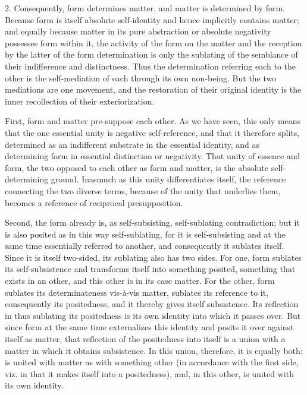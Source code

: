 2. Consequently, form determines matter,
and matter is determined by form.
Because form is itself absolute self-identity
and hence implicitly contains matter;
and equally because matter in its pure abstraction
or absolute negativity possesses form within it,
the activity of the form on the matter
and the reception by the latter of the form determination is only
the sublating of the semblance of their indifference and distinctness.
Thus the determination referring each to the other is
the self-mediation of each through its own non-being.
But the two mediations are one movement,
and the restoration of their original identity is
the inner recollection of their exteriorization.

First, form and matter pre-suppose each other.
As we have seen, this only means that the one essential unity is
negative self-reference, and that it therefore splits,
determined as an indifferent substrate in the essential identity,
and as determining form in essential distinction or negativity.
That unity of essence and form, the two opposed to each other as
form and matter, is the absolute self-determining ground.
Inasmuch as this unity differentiates itself,
the reference connecting the two diverse terms,
because of the unity that underlies them,
becomes a reference of reciprocal presupposition.

Second, the form already is, as self-subsisting,
self-sublating contradiction;
but it is also posited as in this way self-sublating,
for it is self-subsisting and at the same time
essentially referred to another,
and consequently it sublates itself.
Since it is itself two-sided, its sublating also has two sides.
For one, form sublates its self-subsistence
and transforms itself into something posited,
something that exists in an other,
and this other is in its case matter.
For the other, form sublates its determinateness vis-à-vis matter,
sublates its reference to it, consequently its positedness,
and it thereby gives itself subsistence.
Its reflection in thus sublating its positedness is
its own identity into which it passes over.
But since form at the same time externalizes this identity
and posits it over against itself as matter,
that reflection of the positedness into itself is
a union with a matter in which it obtains subsistence.
In this union, therefore, it is equally both:
is united with matter as with something other
(in accordance with the first side, viz. in that it makes
itself into a positedness),
and, in this other, is united with its own identity.

